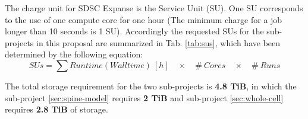 The charge unit for SDSC Expanse is the Service Unit (SU). One SU corresponds to the use of one compute
core for one hour (The minimum charge for a job longer than 10 seconds is 1 SU). Accordingly the
 requested SUs for the sub-projects in this proposal are summarized in Tab. \ref{tab:sus}, which 
have been determined by the following equation: $$SUs = \sum Runtime (Wall time)~[h]\quad \times\quad \#~Cores\quad \times\quad \#~Runs$$

The total storage requirement for the two sub-projects is \textbf{4.8 TiB}, in which the 
sub-project \ref{sec:spine-model} requires \textbf{2 TiB} and sub-project \ref{sec:whole-cell} requires \textbf{2.8 TiB} of storage.

\begin{table}
\caption{Total number of anticipated SUs on SDSC Expanse for the two requested sub-projects 
as outlined in sections \ref{sec:spine-model}, \ref{sec:whole-cell}.}
\label{tab:sus}
\end{table}
